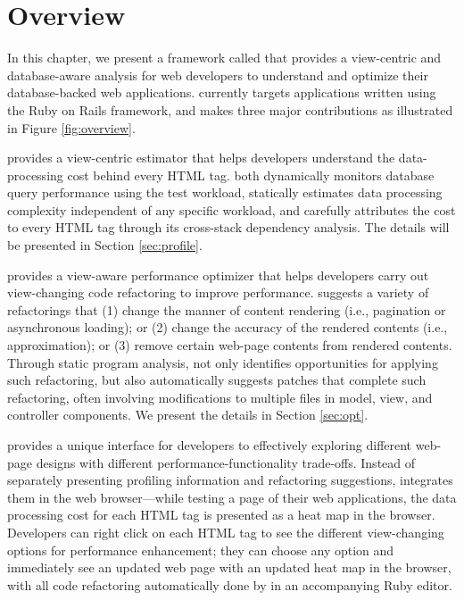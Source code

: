 \section{Overview}

In this chapter, we present a framework called \ToolP that provides a view-centric 
and database-aware analysis
for web developers to understand and optimize 
their database-backed web applications. \ToolP currently targets applications  written using the Ruby on Rails framework, and makes three major contributions as illustrated in Figure \ref{fig:overview}.

\ToolP provides a view-centric estimator that helps developers understand the 
data-processing cost behind every HTML tag. 
\ToolP both dynamically monitors database query performance using the test workload, statically estimates data processing complexity independent of any specific workload, and carefully attributes the cost to every HTML tag
through its cross-stack dependency analysis. The details will be presented in 
Section \ref{sec:profile}.

\ToolP provides a view-aware performance optimizer that helps developers carry out
view-changing code refactoring to improve performance. \ToolP suggests a variety
of refactorings that (1) change the manner of content rendering (i.e., pagination or asynchronous loading);
or (2) change the accuracy of the rendered contents (i.e., approximation);
or (3) remove certain web-page contents from rendered contents. Through static program
analysis, \ToolP not only identifies opportunities for applying such refactoring,
but also automatically suggests patches that complete such refactoring,
often involving modifications to multiple files in model, view, and controller components.
We present the details in Section \ref{sec:opt}.


\ToolP provides a unique interface for developers to effectively
exploring different web-page designs with different performance-functionality trade-offs.
Instead of separately presenting profiling information and refactoring suggestions, \ToolP integrates them in the web browser---while testing a page of their web applications, the data processing cost for each HTML tag is presented as a heat map in the browser. Developers can right click on each
HTML tag to see the different view-changing options for performance enhancement; they can 
choose any option and immediately see an updated web page with an updated heat map in the browser,
with all code refactoring automatically done by \ToolP in an accompanying Ruby editor.


